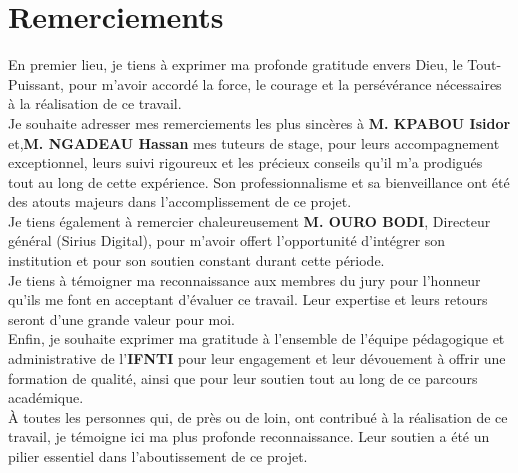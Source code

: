 \chapter*{Remerciements}
\thispagestyle{empty}

En premier lieu, je tiens à exprimer ma profonde gratitude envers Dieu, le Tout-Puissant, pour m’avoir accordé la force, le courage et la persévérance nécessaires à la réalisation de ce travail.\\

Je souhaite adresser mes remerciements les plus sincères à \textbf{M. KPABOU Isidor} et,\textbf{M. NGADEAU Hassan} mes tuteurs de stage, pour leurs accompagnement exceptionnel, leurs suivi rigoureux et les précieux conseils qu’il m’a prodigués tout au long de cette expérience. Son professionnalisme et sa bienveillance ont été des atouts majeurs dans l’accomplissement de ce projet.\\

Je tiens également à remercier chaleureusement \textbf{M. OURO BODI}, Directeur général (\ac{Sirius Digital}), pour m’avoir offert l’opportunité d’intégrer son institution et pour son soutien constant durant cette période.\\


Je tiens à témoigner ma reconnaissance aux membres du jury pour l’honneur qu’ils me font en acceptant d’évaluer ce travail. Leur expertise et leurs retours seront d’une grande valeur pour moi.\\

Enfin, je souhaite exprimer ma gratitude à l’ensemble de l’équipe pédagogique et administrative de l’\textbf{\ac{IFNTI}} pour leur engagement et leur dévouement à offrir une formation de qualité, ainsi que pour leur soutien tout au long de ce parcours académique.\\

À toutes les personnes qui, de près ou de loin, ont contribué à la réalisation de ce travail, je témoigne ici ma plus profonde reconnaissance. Leur soutien a été un pilier essentiel dans l’aboutissement de ce projet.

\clearpage